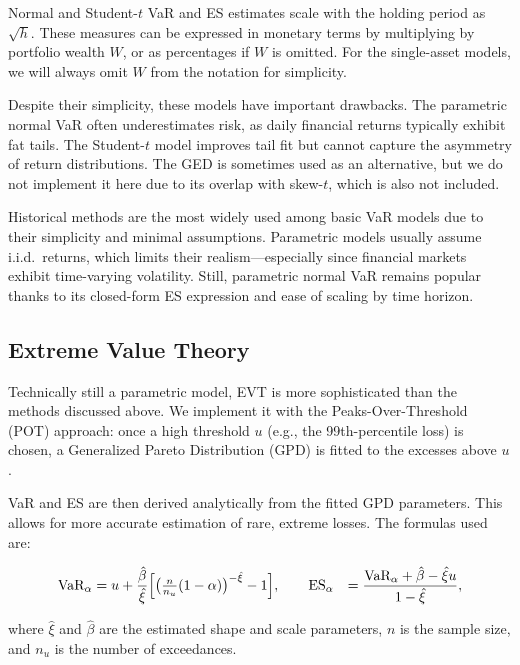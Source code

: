 \documentclass[12pt]{article}
\begin{document}
Normal and Student-$t$ VaR and ES estimates scale with the holding period as $\sqrt{h}$. These measures can be expressed in monetary terms by multiplying by portfolio wealth $W$, or as percentages if $W$ is omitted. For the single-asset models, we will always omit $W$ from the notation for simplicity.

Despite their simplicity, these models have important drawbacks. The parametric normal VaR often underestimates risk, as daily financial returns typically exhibit fat tails. The Student-$t$ model improves tail fit but cannot capture the asymmetry of return distributions. The GED is sometimes used as an alternative, but we do not implement it here due to its overlap with skew-$t$, which is also not included.

Historical methods are the most widely used among basic VaR models due to their simplicity and minimal assumptions. Parametric models usually assume i.i.d.\ returns, which limits their realism—especially since financial markets exhibit time-varying volatility. Still, parametric normal VaR remains popular thanks to its closed-form ES expression and ease of scaling by time horizon.



\subsection{Extreme Value Theory}

Technically still a parametric model, EVT is more sophisticated than the methods discussed above. We implement it with the Peaks-Over-Threshold (POT) approach: once a high threshold $u$ (e.g., the 99th-percentile loss) is chosen, a Generalized Pareto Distribution (GPD) is fitted to the excesses above $u$. 

VaR and ES are then derived analytically from the fitted GPD parameters. This allows for more accurate estimation of rare, extreme losses. The formulas used are:

\[
\begin{aligned}
{\text{VaR}}_\alpha &= u + \frac{\hat{\beta}}{\hat{\xi}}
\Bigl[\bigl(\tfrac{n}{n_u}(1-\alpha)\bigr)^{-\hat{\xi}} - 1\Bigr],\qquad
{\text{ES}}_\alpha &= \frac{{\text{VaR}}_\alpha + \hat{\beta} - \hat{\xi} u}{1 - \hat{\xi}},
\end{aligned}
\]

where $\hat{\xi}$ and $\hat{\beta}$ are the estimated shape and scale parameters, $n$ is the sample size, and $n_u$ is the number of exceedances.
\end{document}
